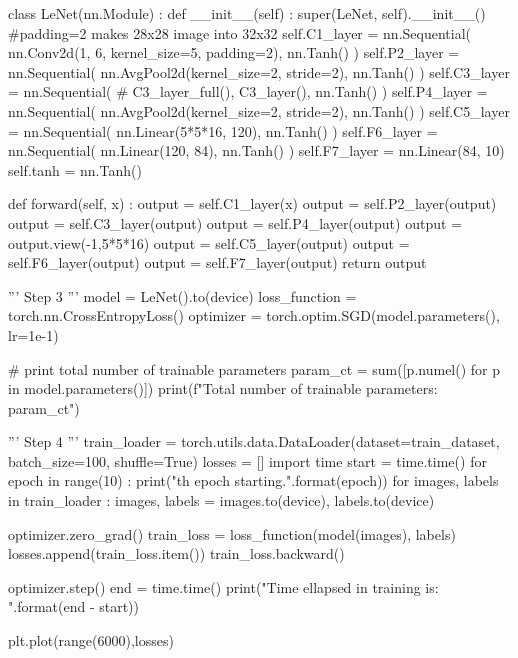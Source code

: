 \documentclass[10pt]{article}
\begin{document}
\begin{python}
class LeNet(nn.Module) :
    def __init__(self) :
        super(LeNet, self).__init__()
        #padding=2 makes 28x28 image into 32x32
        self.C1_layer = nn.Sequential(
                nn.Conv2d(1, 6, kernel_size=5, padding=2),
                nn.Tanh()
                )
        self.P2_layer = nn.Sequential(
                nn.AvgPool2d(kernel_size=2, stride=2),
                nn.Tanh()
                )
        self.C3_layer = nn.Sequential(
                # C3_layer_full(),
                C3_layer(),
                nn.Tanh()
                )
        self.P4_layer = nn.Sequential(
                nn.AvgPool2d(kernel_size=2, stride=2),
                nn.Tanh()
                )
        self.C5_layer = nn.Sequential(
                nn.Linear(5*5*16, 120),
                nn.Tanh()
                )
        self.F6_layer = nn.Sequential(
                nn.Linear(120, 84),
                nn.Tanh()
                )
        self.F7_layer = nn.Linear(84, 10)
        self.tanh = nn.Tanh()
        
    def forward(self, x) :
        output = self.C1_layer(x)
        output = self.P2_layer(output)
        output = self.C3_layer(output)
        output = self.P4_layer(output)
        output = output.view(-1,5*5*16)
        output = self.C5_layer(output)
        output = self.F6_layer(output)
        output = self.F7_layer(output)
        return output

    
'''
Step 3
'''
model = LeNet().to(device)
loss_function = torch.nn.CrossEntropyLoss()
optimizer = torch.optim.SGD(model.parameters(), lr=1e-1)

# print total number of trainable parameters
param_ct = sum([p.numel() for p in model.parameters()])
print(f"Total number of trainable parameters: {param_ct}")

'''
Step 4
'''
train_loader = torch.utils.data.DataLoader(dataset=train_dataset, batch_size=100, shuffle=True)
losses = []
import time
start = time.time()
for epoch in range(10) :
    print("{}th epoch starting.".format(epoch))
    for images, labels in train_loader :
        images, labels = images.to(device), labels.to(device)
        
        optimizer.zero_grad()
        train_loss = loss_function(model(images), labels)
        losses.append(train_loss.item())
        train_loss.backward()

        optimizer.step()
end = time.time()
print("Time ellapsed in training is: {}".format(end - start))

plt.plot(range(6000),losses)



\end{python}
\end{document}
